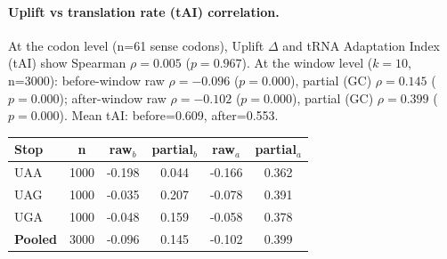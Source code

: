 \paragraph{Uplift vs translation rate (tAI) correlation.}
At the codon level (n=61 sense codons), Uplift $\Delta$ and tRNA Adaptation Index (tAI) show Spearman $\rho=0.005$ ($p=0.967$).
At the window level ($k=10$, n=3000): before-window raw $\rho=-0.096$ ($p=0.000$), partial (GC) $\rho=0.145$ ($p=0.000$); after-window raw $\rho=-0.102$ ($p=0.000$), partial (GC) $\rho=0.399$ ($p=0.000$).
Mean tAI: before=0.609, after=0.553.
\begin{center}\small\begin{tabular}{lccccc}\toprule
Stop & n & raw$_b$ & partial$_b$ & raw$_a$ & partial$_a$ \\\midrule
UAA & 1000 & -0.198 & 0.044 & -0.166 & 0.362 \\
UAG & 1000 & -0.035 & 0.207 & -0.078 & 0.391 \\
UGA & 1000 & -0.048 & 0.159 & -0.058 & 0.378 \\
\textbf{Pooled} & 3000 & -0.096 & 0.145 & -0.102 & 0.399 \\
\bottomrule\end{tabular}\end{center}
